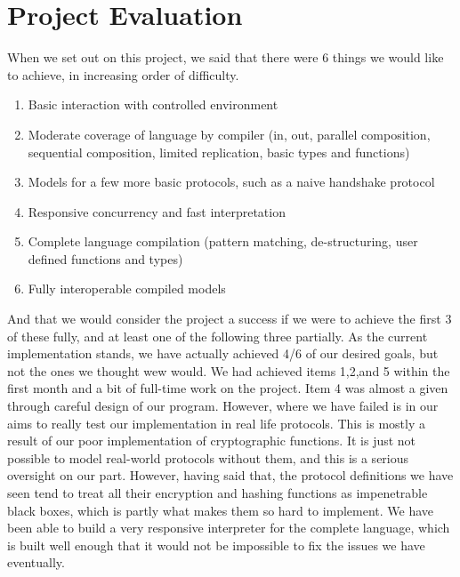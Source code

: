 \section{Project Evaluation}

When we set out on this project, we said that there were 6 things we would like to achieve, in increasing order of difficulty.
\begin{enumerate}
    \item Basic interaction with controlled environment
    \item Moderate coverage of language by compiler (in, out, parallel composition, sequential composition, limited replication, basic types and functions) 
    \item Models for a few more basic protocols, such as a naive handshake protocol
    \item Responsive concurrency and fast interpretation
    \item Complete language compilation (pattern matching, de-structuring, user defined functions and types)
    \item Fully interoperable compiled models
\end{enumerate}
And that we would consider the project a success if we were to achieve the first 3 of these fully, and at least one of the following three partially.
As the current implementation stands, we have actually achieved 4/6 of our desired goals, but not the ones we thought wew would. We had achieved items 1,2,and 5 within the first month and a bit of full-time work on the project. Item 4 was almost a given through careful design of our program. However, where we have failed is in our aims to really test our implementation in real life protocols. This is mostly a result of our poor implementation of cryptographic functions. It is just not
possible to model real-world protocols without them, and this is a serious oversight on our part. However, having said that, the protocol definitions we have seen tend to treat all their encryption and hashing functions as impenetrable black boxes, which is partly what makes them so hard to implement.
We have been able to build a very responsive interpreter for the complete language, which is built well enough that it would not be impossible to fix the issues we have eventually.

